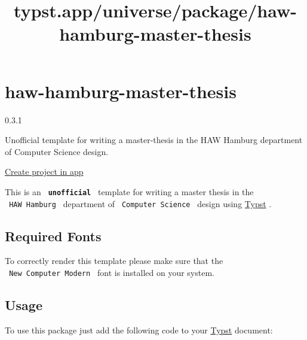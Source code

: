 \title{typst.app/universe/package/haw-hamburg-master-thesis}

\label{banner}
\label{template-thumbnail}

\section{haw-hamburg-master-thesis}\label{haw-hamburg-master-thesis}

{ 0.3.1 }

Unofficial template for writing a master-thesis in the HAW Hamburg
department of Computer Science design.

\href{/app?template=haw-hamburg-master-thesis&version=0.3.1}{Create
project in app}

\label{readme}
This is an \textbf{\texttt{\ unofficial\ }} template for writing a
master thesis in the \texttt{\ HAW\ Hamburg\ } department of
\texttt{\ Computer\ Science\ } design using
\href{https://github.com/typst/typst}{Typst} .

\subsection{Required Fonts}\label{required-fonts}

To correctly render this template please make sure that the
\texttt{\ New\ Computer\ Modern\ } font is installed on your system.

\subsection{Usage}\label{usage}

To use this package just add the following code to your
\href{https://github.com/typst/typst}{Typst} document:

\begin{Shaded}
\begin{Highlighting}[]




\NormalTok{)}
\end{Highlighting}
\end{Shaded}

